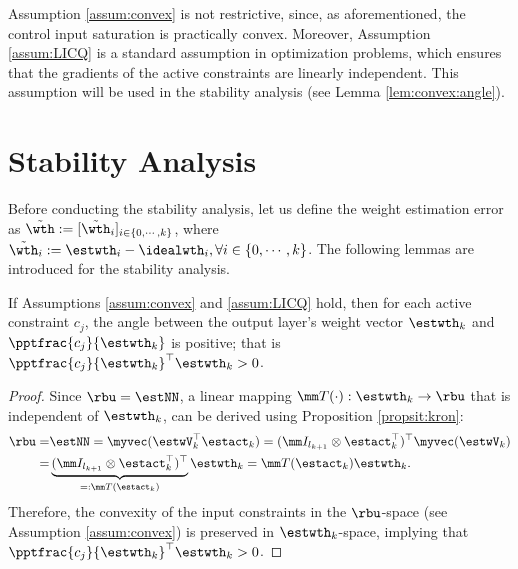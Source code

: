 \documentclass[journal]{IEEEtran}
\begin{document}
\begin{remark}
    Assumption \ref{assum:convex} is not restrictive, since, as aforementioned, the control input saturation is practically convex.
    Moreover, Assumption \ref{assum:LICQ} is a standard assumption in optimization problems, which ensures that the gradients of the active constraints are linearly independent.
    This assumption will be used in the stability analysis (see Lemma \ref{lem:convex:angle}).
\end{remark}

\section{Stability Analysis}\label{sec:stability}

Before conducting the stability analysis, let us define the weight estimation error as $\tilde\wth:= [\tilde\wth_i]_{i\in\{0,\cdots,k\}}$, where $\tilde\wth_i:=\estwth_i-\idealwth_i, \forall i\in\{0,\cdots,k\}$.
The following lemmas are introduced for the stability analysis. 

\begin{lem}
    If Assumptions \ref{assum:convex} and \ref{assum:LICQ} hold, then for each active constraint $c_j$, the angle between the output layer's weight vector $\estwth_k$ and $\pptfrac{c_j}{\estwth_k}$ is positive; that is $\pptfrac{c_j}{\estwth_k}^\top\estwth_k>0$.
    \label{lem:convex:angle}
\end{lem}

\begin{proof}

Since $\rbu = \estNN$, a linear mapping $\mm T(\cdot):\estwth_k\to\rbu$ that is independent of $\estwth_k$, can be derived using Proposition \ref{propsit:kron}:
\begin{equation}\label{eq:linear:map}
    \begin{aligned}
    \rbu 
    = 
    &
    \estNN 
    =
    \myvec(
        \estwV_k^\top \estact_k
    ) 
    = 
    (
        \mm I_{l_{k+1}}
        \otimes 
        \estact_k^\top
    )^\top
    \myvec(\estwV_k)
    \\
    = &
    \underbrace{
        (
        \mm I_{l_{k+1}}
        \otimes 
        \estact_k^\top
    )^\top}_{=:\mm T(\estact_k)}
    \estwth_k 
    =
    \mm T(\estact_k) \estwth_k.
    \end{aligned}
\end{equation}
Therefore, the convexity of the input constraints in the $\rbu$-space (see Assumption \ref{assum:convex}) is preserved in $\estwth_k$-space, implying
that $\pptfrac{c_j}{\estwth_k}^\top\estwth_k>0$.

\end{proof}
\end{document}
